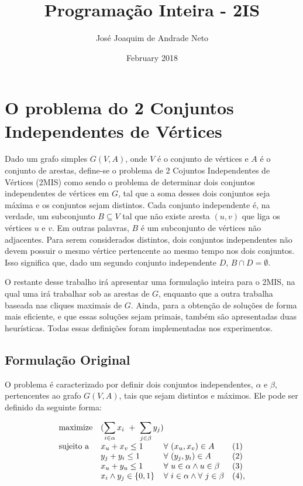 \documentclass[12pt]{article}
\title{Programação Inteira - 2IS}
\author{José Joaquim de Andrade Neto}
\date{February 2018}
\begin{document}
\maketitle

\section{O problema do 2 Conjuntos Independentes de Vértices}

Dado um grafo simples $G(V, A)$, onde $V$ é o conjunto de vértices e $A$ é o conjunto de arestas, define-se o problema de 2 Cojuntos Independentes de Vértices (2MIS) como sendo o problema de determinar dois conjuntos independentes de vértices em $G$, tal que a soma desses dois conjuntos seja máxima e os conjuntos sejam distintos.
Cada conjunto independente é, na verdade, um subconjunto $B \subseteq V$ tal que não existe aresta $(u, v)$ que liga os vértices $u$ e $v$. Em outras palavras, $B$ é um subconjunto de vértices não adjacentes. Para serem considerados distintos, dois conjuntos independentes não devem possuir o mesmo vértice pertencente ao mesmo tempo nos dois conjuntos. Isso significa que, dado um segundo conjunto independente $D$, $B \cap D = \emptyset$.

O restante desse trabalho irá apresentar uma formulação inteira para o 2MIS, na qual uma irá trabalhar sob as arestas de $G$, enquanto que a outra trabalha baseada nas cliques maximais de $G$. Ainda, para a obtenção de soluções de forma mais eficiente, e que essas soluções sejam primais, também são apresentadas duas heurísticas. Todas essas definições foram implementadas nos experimentos.  

\subsection{Formulação Original}

O problema é caracterizado por definir dois conjuntos independentes, $\alpha$ e $\beta$, pertencentes ao grafo $G(V, A)$, tais que sejam distintos e máximos. Ele pode ser definido da seguinte forma:

\begin{equation*}
\begin{array}{ll@{}ll}
\text{maximize}  & \displaystyle(\sum\limits_{i \in \alpha} x_{i}\ +\ \sum\limits_{j \in \beta}y_j)\\
\text{sujeito a }& \displaystyle x_u + x_v \leq 1 &\forall \ (x_u, x_v) \in A & (1) \\
                 & \displaystyle y_j + y_i \leq 1 &\forall \ (y_j, y_i) \in A & (2) \\
                 & \displaystyle x_u + y_u \leq 1 &\forall \ u \in \alpha \wedge u \in \beta & (3)\\
                 & \displaystyle x_i \wedge y_j \in \{0,1\} &\forall \ i \in \alpha \wedge \forall \ j \in \beta & (4),
\end{array}
\end{equation*}
\end{document}
